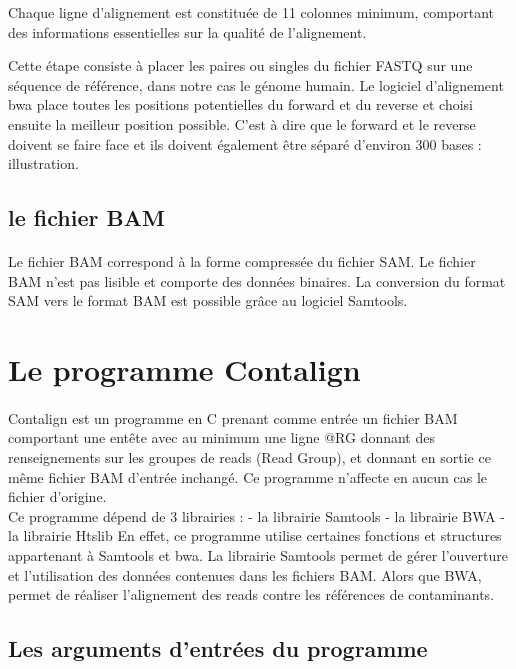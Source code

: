 \documentclass[a4paper,12pt]{article}
\begin{document}
Chaque ligne d'alignement est constituée de 11 colonnes minimum, comportant des informations essentielles sur la qualité de l'alignement.   






Cette étape consiste à placer les paires ou singles du fichier FASTQ sur une séquence de référence, dans notre cas le génome humain. Le logiciel d'alignement bwa place toutes les positions potentielles du forward et du reverse et choisi ensuite la meilleur position possible. C'est à dire que le forward et le reverse doivent se faire face et ils doivent également être séparé d'environ 300 bases  : illustration. 
\subsection{le fichier BAM}
\paragraph{}
Le fichier BAM correspond à la forme compressée du fichier SAM. Le fichier BAM n'est pas lisible et comporte des données binaires. La conversion du format SAM vers le format BAM est possible grâce au logiciel Samtools. 
 \\
\section{Le programme Contalign}
\paragraph{}

Contalign est un programme en C prenant comme entrée un fichier BAM comportant une entête avec au minimum une ligne @RG donnant des renseignements sur les groupes de reads (Read Group), et donnant en sortie ce même fichier BAM d'entrée inchangé. Ce programme n'affecte en aucun cas le fichier d'origine.  \\
Ce programme dépend de 3 librairies : 
- la librairie Samtools
- la librairie BWA
- la librairie Htslib
En effet, ce programme utilise certaines fonctions et structures appartenant à Samtools et bwa. La librairie Samtools permet de gérer l'ouverture et l'utilisation des données contenues dans les fichiers BAM. Alors que BWA, permet de réaliser l'alignement des reads contre les références de contaminants. 
\\
\subsection{Les arguments d'entrées du programme}
\end{document}
